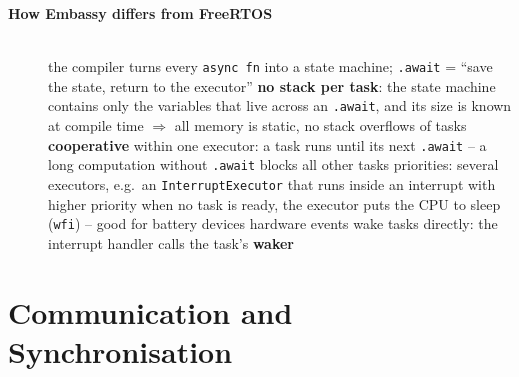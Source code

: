 \begin{description}
\item[{\rot\bf How Embassy differs from FreeRTOS}]~\\[-\lblskip]
\bi
	\ite the compiler turns every \texttt{async fn} into a state machine; \texttt{.await} = ``save the state, return to the executor''
	\ite \textbf{no stack per task}: the state machine contains only the variables that live across an \texttt{.await}, and its size is known at compile time $\Rightarrow$ all memory is static, no stack overflows of tasks
	\ite \textbf{cooperative} within one executor: a task runs until its next \texttt{.await} -- a long computation without \texttt{.await} blocks all other tasks
	\ite priorities: several executors, e.g.\ an \texttt{InterruptExecutor} that runs inside an interrupt with higher priority
	\ite when no task is ready, the executor puts the CPU to sleep (\texttt{wfi}) -- good for battery devices
	\ite hardware events wake tasks directly: the interrupt handler calls the task's \textbf{waker}
\ei
\os{\newpage}
\end{description}

\section{Communication and Synchronisation}

